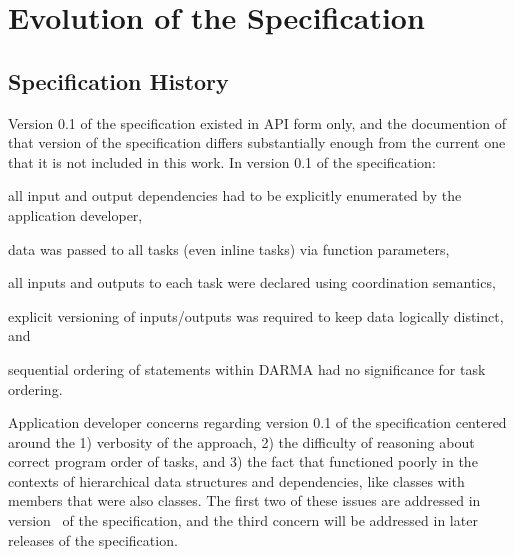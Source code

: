 
\chapter{Evolution of the Specification}
\label{chap:evolution}
\section{Specification History}
\label{sec:past}
Version 0.1 of the specification existed in \gls{API} form only, and
the documention of that version of the specification differs substantially
enough from the current one that it is not included in this work.
In version 0.1 of the specification:
\begin{compactenum}
\item all input and output dependencies had to be explicitly enumerated by the application
developer,
\item data was passed to all \glspl{task} (even inline \glspl{task}) via function parameters,
\item all inputs and outputs to each \gls{task} were declared using \gls{coordination semantics},
\item explicit versioning of inputs/outputs was required to keep data
logically distinct, and
\item sequential ordering of statements within \gls{DARMA} had no significance for task ordering.
\end{compactenum}

 Application developer concerns regarding version 0.1 of the specification
 centered around the 1) verbosity of the approach, 2) the difficulty of
 reasoning about correct program order of \glspl{task}, and 3) the fact that 
  functioned poorly in the contexts of hierarchical data
 structures and dependencies, like classes with members that were also
 classes.  The first two of these issues are addressed in version \specVersion\ of the
 specification, and the third concern will be addressed in later releases of the specification.

